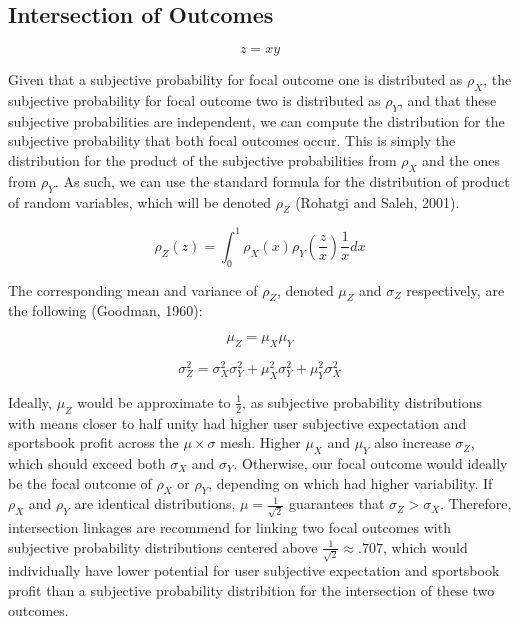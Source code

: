 \documentclass[sn-mathphys-num]{sn-jnl}
\theoremstyle{thmstyleone}%
\theoremstyle{thmstyletwo}%
\theoremstyle{thmstylethree}%
\begin{document}
\subsection{Intersection of Outcomes}

\begin{equation}
z = x y
\end{equation}
\vspace{.05in}

Given that a subjective probability for focal outcome one is distributed as $\rho_X$, the subjective probability for focal outcome two is distributed as $\rho_Y$, and that these subjective probabilities are independent, we can compute the distribution for the subjective probability that both focal outcomes occur. This is simply the distribution for the product of the subjective probabilities from $\rho_X$ and the ones from $\rho_Y$. As such, we can use the standard formula for the distribution of product of random variables, which will be denoted $\rho_Z$ (Rohatgi and Saleh, 2001).

\begin{equation}
\rho_Z(z) = \int_{0}^{1}\rho_X(x) \rho_Y(\frac{z}{x})\frac{1}{x}dx
\end{equation}
\vspace{.05in}

The corresponding mean and variance of $\rho_Z$, denoted $\mu_Z$ and $\sigma_Z$ respectively, are the following (Goodman, 1960):

\begin{equation}
\mu_Z = \mu_X \mu_Y
\end{equation}

\begin{equation}
\sigma_Z^2 = \sigma_X^2 \sigma_Y^2 + \mu_X^2 \sigma_Y^2 + \mu_Y^2 \sigma_X^2
\end{equation}
\vspace{.05in}

Ideally, $\mu_Z$ would be approximate to $\frac{1}{2}$, as subjective probability distributions with means closer to half unity had higher user subjective expectation and sportsbook profit across the $\mu \times \sigma$ mesh. Higher $\mu_X$ and $\mu_Y$ also increase $\sigma_Z$, which should exceed both $\sigma_X$ and $\sigma_Y$. Otherwise, our focal outcome would ideally be the focal outcome of $\rho_X$ or $\rho_Y$, depending on which had higher variability. If $\rho_X$ and $\rho_Y$ are identical distributions, $\mu = \frac{1}{\sqrt{2}}$ guarantees that $\sigma_Z > \sigma_X$. Therefore, intersection linkages are recommend for linking two focal outcomes with subjective probability distributions centered above $\frac{1}{\sqrt{2}} \approx .707$, which would individually have lower potential for user subjective expectation and sportsbook profit than a subjective probability distribition for the intersection of these two outcomes. 
\end{document}
